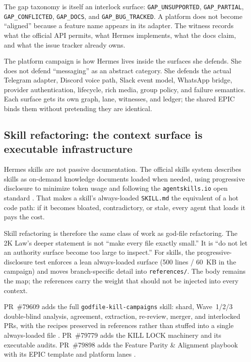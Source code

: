 \documentclass[11pt]{article}
\theoremstyle{definition}
\theoremstyle{plain}
\theoremstyle{remark}
\begin{document}
The gap taxonomy is itself an interlock surface:
\texttt{GAP\_UNSUPPORTED}, \texttt{GAP\_PARTIAL},
\texttt{GAP\_CONFLICTED}, \texttt{GAP\_DOCS}, and
\texttt{GAP\_BUG\_TRACKED}. A platform does not become ``aligned'' because a
feature name appears in its adapter. The witness records what the official
API permits, what Hermes implements, what the docs claim, and what the issue
tracker already owns.

The platform campaign is how Hermes lives inside the surfaces she defends.
She does not defend ``messaging'' as an abstract category. She defends the
actual Telegram adapter, Discord voice path, Slack event model, WhatsApp
bridge, provider authentication, lifecycle, rich media, group policy, and
failure semantics. Each surface gets its own graph, lane, witnesses, and
ledger; the shared EPIC binds them without pretending they are identical.

\subsection{Skill refactoring: the context surface is executable infrastructure}
\label{sec:skill-refactoring}

Hermes skills are not passive documentation. The official skills system
 describes skills as on-demand knowledge documents loaded when needed, using
progressive disclosure to minimize token usage and following the
\texttt{agentskills.io} open standard \citep{hermesskills}. That makes a
skill's always-loaded \texttt{SKILL.md} the equivalent of a hot code path:
if it becomes bloated, contradictory, or stale, every agent that loads it
pays the cost.

Skill refactoring is therefore the same class of work as god-file
refactoring. The 2K Law's deeper statement is not ``make every file exactly
small.'' It is ``do not let an authority surface become too large to inspect.''
For skills, the progressive-disclosure test enforces a lean always-loaded
surface (500 lines / 60~KB in the campaign) and moves branch-specific detail
into \texttt{references/}. The body remains the map; the references carry the
weight that should not be injected into every context.

PR~\#79609 adds the full \texttt{godfile-kill-campaigns} skill: shard,
Wave~1/2/3 double-blind analysis, agreement, extraction, re-review, merger,
and interlocked PRs, with the recipes preserved in references rather than
stuffed into a single always-loaded file \citep{hermespr79609}. PR~\#79779
adds the KILL LOCK machinery and its executable audits. PR~\#79898 adds the
Feature Parity \& Alignment playbook with its EPIC template and platform
lanes \citep{hermespr79779,hermespr79898}.
\end{document}
